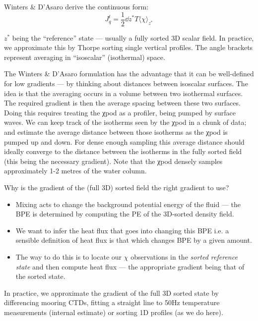 Winters \& D'Asaro derive the continuous form:
\begin{equation}
  J_q^t =  \frac 12 \dd{z^*}{T} \langle χ \rangle_{z^*}
\end{equation}

$z^*$ being the ``reference'' state — usually a fully sorted 3D scalar field.
In practice, we approximate this by Thorpe sorting single vertical profiles.
The angle brackets represent averaging in ``isoscalar'' (isothermal) space.

The Winters \& D'Asaro formulation has the advantage that it can be well-defined for low gradients — by thinking about distances between isoscalar surfaces.
The idea is that the averaging occurs in a volume between two isothermal surfaces.
The required gradient is then the average spacing between these two surfaces.
Doing this requires treating the χpod as a profiler, being pumped by surface waves.
We can keep track of the isotherms seen by the χpod in a chunk of data; and estimate the average distance between those isotherms as the χpod is pumped up and down.
For dense enough sampling this average distance should ideally converge to the distance between the isotherms in the fully sorted field (this being the necessary gradient).
Note that the χpod densely samples approximately 1-2 metres of the water column.

Why is the gradient of the (full 3D) sorted field the right gradient to use?
\begin{itemize}
  \item Mixing acts to change the background potential energy of the fluid --- the BPE is determined by computing the PE of the 3D-sorted density field.
  \item We want to infer the heat flux that goes into changing this BPE i.e. a sensible definition of heat flux is that which changes BPE by a given amount.
  \item The way to do this is to locate our $χ$ observations in the \emph{sorted reference state} and then compute heat flux --- the appropriate gradient being that of the sorted state.
  \end{itemize}
In practice, we approximate the gradient of the full 3D sorted state by differencing mooring CTDs, fitting a straight line to 50Hz temperature measurements (internal estimate) or sorting 1D profiles (as we do here).

